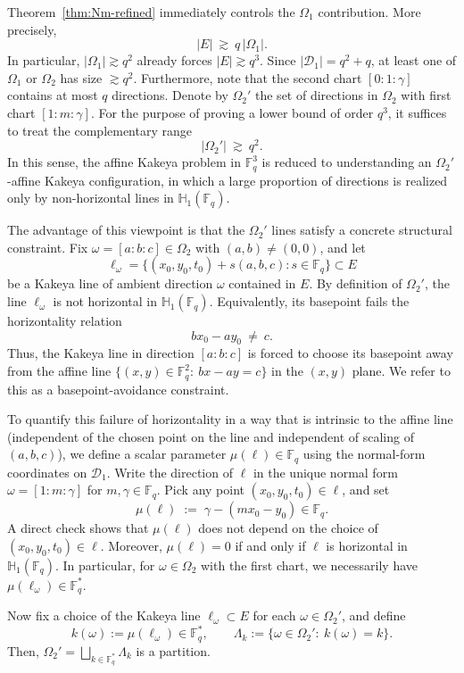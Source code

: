 \documentclass[11pt]{article}
\newcommand{\F}{\mathbb{F}}
\newcommand{\1}{\mathbf 1}
\begin{document}
Theorem~\ref{thm:Nm-refined} immediately controls the \(\Omega_1\) contribution. More precisely,
\[
|E|\ \gtrsim\ q\,|\Omega_1|.
\]
In particular, \(|\Omega_1|\gtrsim q^2\) already forces \(|E|\gtrsim q^3\).
Since \(|\mathcal D_1|=q^2+q\), at least one of \(\Omega_1\) or \(\Omega_2\) has size \(\gtrsim q^2\). Furthermore, note that the second chart $[0:1:\gamma]$ contains at most $q$ directions. Denote by $\Omega_2'$ the set of directions in $\Omega_2$ with first chart $[1:m:\gamma]$. For the purpose of proving a lower bound of
order \(q^3\), it suffices to treat the complementary range
\begin{equation}\label{eq:Omega2-large}
|\Omega_2'|\ \gtrsim\ q^2.
\end{equation}
In this sense, the affine Kakeya problem in \(\mathbb F_q^3\) is reduced to understanding an \(\Omega_2'\)-affine Kakeya configuration, in which a large
proportion of directions is realized only by non-horizontal lines in \(\mathbb H_1(\mathbb F_q)\).

The advantage of this viewpoint is that the $\Omega_2'$ lines satisfy a concrete structural constraint.
Fix $\omega=[a:b:c]\in\Omega_2$ with $(a,b)\neq(0,0)$, and let
\[
\ell_\omega=\{(x_0,y_0,t_0)+s(a,b,c):s\in\F_q\}\subset E
\]
be a Kakeya line of ambient direction $\omega$ contained in $E$.
By definition of $\Omega_2'$, the line $\ell_\omega$ is not horizontal in $\mathbb H_1(\F_q)$.
Equivalently, its basepoint fails the horizontality relation
\[
bx_0-ay_0\ \neq\ c.
\]
Thus, the Kakeya line in direction $[a:b:c]$ is forced to choose its basepoint away from the affine line
$\{(x,y)\in\F_q^2:\ bx-ay=c\}$ in the $(x,y)$ plane. We refer to this as a basepoint-avoidance constraint.

To quantify this failure of horizontality in a way that is intrinsic to the affine line (independent of the chosen point on the line and independent of scaling of $(a,b,c)$), we define a scalar parameter $\mu(\ell)\in\F_q$ using the normal-form coordinates on $\mathcal D_1$.
Write the direction of $\ell$ in the unique normal form $\omega=[1:m:\gamma]$ for $m,\gamma\in\F_q$. Pick any point $(x_0,y_0,t_0)\in\ell$, and set
\[
\mu(\ell)\;:=\;\gamma-(mx_0-y_0)\in\F_q.
\]
A direct check shows that $\mu(\ell)$ does not depend on the choice of $(x_0,y_0,t_0)\in\ell$.
Moreover, $\mu(\ell)=0$ if and only if $\ell$ is horizontal in $\mathbb H_1(\F_q)$. In particular, for $\omega\in\Omega_2$ with the first chart, we necessarily have $\mu(\ell_\omega)\in\F_q^*$.

Now fix a choice of the Kakeya line $\ell_\omega\subset E$ for each $\omega\in\Omega_2'$, and define
\[
k(\omega):=\mu(\ell_\omega)\in\F_q^*,
\qquad
\Lambda_k:=\{\omega\in\Omega_2':\ k(\omega)=k\}.
\]
Then, $\Omega_2'=\bigsqcup\limits_{k\in\F_q^*}\Lambda_k$ is a partition.
\end{document}
